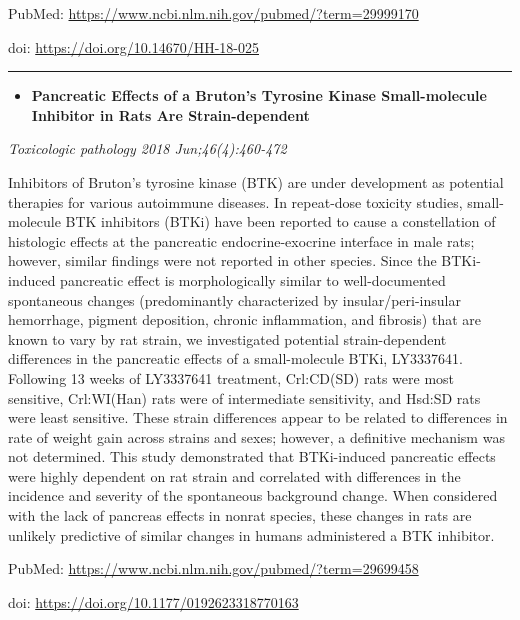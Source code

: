 \documentclass[]{article}
\providecommand{\tightlist}{%
  \setlength{\itemsep}{0pt}\setlength{\parskip}{0pt}}
\begin{document}
PubMed: \url{https://www.ncbi.nlm.nih.gov/pubmed/?term=29999170}

doi: \url{https://doi.org/10.14670/HH-18-025}

{}

{}

\begin{center}\rule{0.5\linewidth}{\linethickness}\end{center}

\begin{itemize}
\tightlist
\item
  \textbf{Pancreatic Effects of a Bruton's Tyrosine Kinase
  Small-molecule Inhibitor in Rats Are Strain-dependent}
\end{itemize}

\emph{Toxicologic pathology 2018 Jun;46(4):460-472}

Inhibitors of Bruton's tyrosine kinase (BTK) are under development as
potential therapies for various autoimmune diseases. In repeat-dose
toxicity studies, small-molecule BTK inhibitors (BTKi) have been
reported to cause a constellation of histologic effects at the
pancreatic endocrine-exocrine interface in male rats; however, similar
findings were not reported in other species. Since the BTKi-induced
pancreatic effect is morphologically similar to well-documented
spontaneous changes (predominantly characterized by insular/peri-insular
hemorrhage, pigment deposition, chronic inflammation, and fibrosis) that
are known to vary by rat strain, we investigated potential
strain-dependent differences in the pancreatic effects of a
small-molecule BTKi, LY3337641. Following 13 weeks of LY3337641
treatment, Crl:CD(SD) rats were most sensitive, Crl:WI(Han) rats were of
intermediate sensitivity, and Hsd:SD rats were least sensitive. These
strain differences appear to be related to differences in rate of weight
gain across strains and sexes; however, a definitive mechanism was not
determined. This study demonstrated that BTKi-induced pancreatic effects
were highly dependent on rat strain and correlated with differences in
the incidence and severity of the spontaneous background change. When
considered with the lack of pancreas effects in nonrat species, these
changes in rats are unlikely predictive of similar changes in humans
administered a BTK inhibitor.

PubMed: \url{https://www.ncbi.nlm.nih.gov/pubmed/?term=29699458}

doi: \url{https://doi.org/10.1177/0192623318770163}

{}
\end{document}
